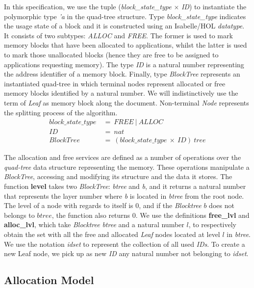 In this specification, we use the tuple (\emph{block\_state\_type} $\times$ \emph{ID}) to instantiate the polymorphic type \emph{'a} in the quad-tree structure. Type \emph{block\_state\_type} indicates the usage state of a block and it is constructed using an Isabelle/HOL \emph{datatype}. It consists of two subtypes: \emph{ALLOC} and \emph{FREE}. The former is used to mark memory blocks that have been allocated to applications, whilst the latter is used to mark those unallocated blocks (hence they are free to be assigned to applications requesting memory). The type \emph{ID} is a natural number representing the address identifier of a memory block. Finally, type \emph{BlockTree} represents an instantiated quad-tree in which terminal nodes represent allocated or free memory blocks identified by a natural number. We will indistinctively use the term of \emph{Leaf} as memory block along the document. Non-terminal \emph{Node} represents the splitting process of the algorithm.
\begin{align*}
block\_state\_type\ &=\ FREE\ |\ ALLOC \\
ID\ &=\ nat \\
BlockTree\ &=\ (block\_state\_type\ \times\ ID)\ tree
\end{align*}

The allocation and free services are defined as a number of operations over the \emph{quad-tree} data structure representing the memory. These operations manipulate a \textsl{BlockTree}, accessing and modifying its structure and the data it stores. The function \textbf{level} takes two \emph{BlockTree}: \emph{btree} and \emph{b}, and it returns a natural number that represents the layer number where \emph{b} is located in \emph{btree} from the root node. The level of a node with regards to itself is $0$, and if the \emph{Blocktree} $b$ does not belongs to $btree$, the function also returns $0$. We use the definitions \textbf{free\_lvl} and \textbf{alloc\_lvl}, which take \emph{Blocktree} \emph{btree} and a natural number $l$, to respectively obtain the set with all the free and allocated \emph{Leaf} nodes located at level $l$ in \emph{btree}. We use the notation \emph{idset} to represent the collection of all used \emph{IDs}. To create a new Leaf node, we pick up as new \emph{ID} any natural number not belonging to \emph{idset}.

\subsection{Allocation Model}

